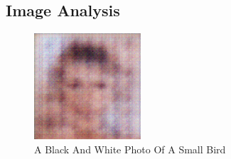 \documentclass{article}%
\begin{document}
%
\subsection{Image Analysis}%
\label{subsec:ImageAnalysis}%


\begin{figure}[h!]%
\centering%
\includegraphics[width=150px]{500_fake_images/samples_5_235.png}%
\caption{A Black And White Photo Of A Small Bird}%
\end{figure}

%
\end{document}
